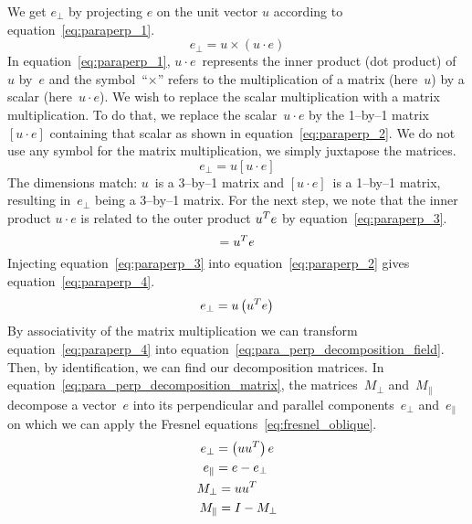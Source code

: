 We get $e_\perp$ by projecting $e$ on the unit vector $u$ according to equation~\eqref{eq:paraperp_1}.
\begin{equation}
    e_\perp = u \times (u \cdot e) \label{eq:paraperp_1}
\end{equation}
In equation~\eqref{eq:paraperp_1}, $u \cdot e$~represents the inner product (dot product) of~$u$ by~$e$ and the symbol~``$\times$'' refers to the multiplication of a matrix (here~$u$) by a scalar (here~$u \cdot e$).
We wish to replace the scalar multiplication with a matrix multiplication.
To do that, we replace the scalar~$u \cdot e$ by the 1--by--1 matrix~$[u \cdot e]$ containing that scalar as shown in equation~\eqref{eq:paraperp_2}.
We do not use any symbol for the matrix multiplication, we simply juxtapose the matrices.
\begin{equation}
    e_\perp = u [u \cdot e] \label{eq:paraperp_2}
\end{equation}
The dimensions match: $u$~is a 3--by--1 matrix and $[u \cdot e]$~is a 1--by--1 matrix, resulting in~$e_\perp$ being a 3--by--1 matrix.
For the next step, we note that the inner product $u \cdot e$ is related to the outer product $u^T e$ by equation~\eqref{eq:paraperp_3}.
\begin{equation}
    [u \cdot e] = u\transp e \label{eq:paraperp_3}
\end{equation}
Injecting equation~\eqref{eq:paraperp_3} into equation~\eqref{eq:paraperp_2} gives equation~\eqref{eq:paraperp_4}.
\begin{equation}
    e_\perp = u \left( u^T e \right) \label{eq:paraperp_4}
\end{equation}
By associativity of the matrix multiplication we can transform equation~\eqref{eq:paraperp_4} into equation~\eqref{eq:para_perp_decomposition_field}.
Then, by identification, we can find our decomposition matrices.
In equation~\eqref{eq:para_perp_decomposition_matrix}, the matrices~$M_\perp$ and~$M_\parallel$ decompose a vector~$e$ into its perpendicular and parallel components~$e_\perp$ and~$e_\parallel$ on which we can apply the Fresnel equations~\eqref{eq:fresnel_oblique}.
\begin{gather}
    \begin{aligned}
        e_\perp &= \left(u u^T \right) e
        \\
        e_\parallel &= e - e_\perp
    \end{aligned}
    \label{eq:para_perp_decomposition_field}
    \\
    \begin{aligned}
        M_\perp &= u u^T   \\
        M_\parallel & = I - M_\perp
    \end{aligned}
    \label{eq:para_perp_decomposition_matrix}
\end{gather}

